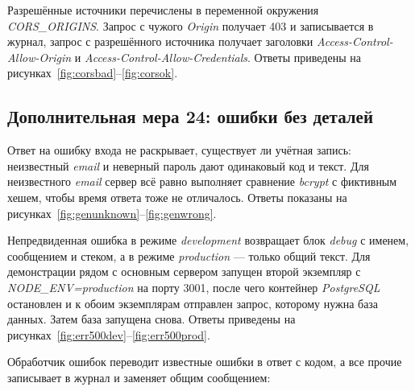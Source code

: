 \documentclass{stp}
\begin{document}
Разрешённые источники перечислены в переменной окружения \textit{CORS\_ORIGINS}.
Запрос с чужого \textit{Origin} получает 403 и записывается в журнал, запрос с
разрешённого источника получает заголовки \textit{Access-Control-Allow-Origin} и
\textit{Access-Control-Allow-Credentials}. Ответы приведены на
рисунках~\ref{fig:corsbad}--\ref{fig:corsok}.



\subsection{Дополнительная мера 24: ошибки без деталей}

Ответ на ошибку входа не раскрывает, существует ли учётная запись:
неизвестный \textit{email} и неверный пароль дают одинаковый код и текст. Для
неизвестного \textit{email} сервер всё равно выполняет сравнение \textit{bcrypt} с
фиктивным хешем, чтобы время ответа тоже не отличалось. Ответы показаны
на рисунках~\ref{fig:genunknown}--\ref{fig:genwrong}.



Непредвиденная ошибка в режиме \textit{development} возвращает блок \textit{debug} с
именем, сообщением и стеком, а в режиме \textit{production} — только общий текст.
Для демонстрации рядом с основным сервером запущен второй экземпляр с
\textit{NODE\_ENV=production} на порту 3001, после чего контейнер \textit{PostgreSQL}
остановлен и к обоим экземплярам отправлен запрос, которому нужна база
данных. Затем база запущена снова.
Ответы приведены на рисунках~\ref{fig:err500dev}--\ref{fig:err500prod}.



Обработчик ошибок переводит известные ошибки в ответ с кодом, а все
прочие записывает в журнал и заменяет общим сообщением:
\end{document}
